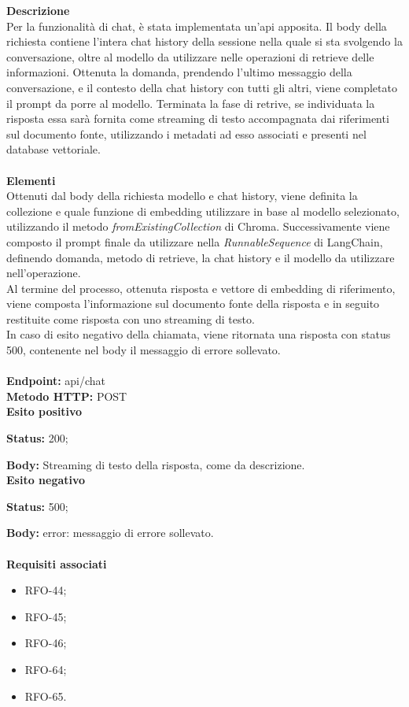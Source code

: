 \textbf{Descrizione}\\
Per la funzionalità di chat, è stata implementata un'api apposita. Il body della richiesta contiene l'intera chat history della sessione nella quale si sta svolgendo la conversazione, oltre al modello da utilizzare nelle operazioni di retrieve delle informazioni. Ottenuta la domanda, prendendo l'ultimo messaggio della conversazione, e il contesto della chat history con tutti gli altri, viene completato il prompt da porre al modello. Terminata la fase di retrive, se individuata la risposta essa sarà fornita come streaming di testo accompagnata dai riferimenti sul documento fonte, utilizzando i metadati ad esso associati e presenti nel database vettoriale. \\ \\
\textbf{Elementi}\\
Ottenuti dal body della richiesta modello e chat history, viene definita la collezione e quale funzione di embedding utilizzare in base al modello selezionato, utilizzando il metodo \textit{fromExistingCollection} di Chroma. Successivamente viene composto il prompt finale da utilizzare nella \textit{RunnableSequence} di LangChain, definendo domanda, metodo di retrieve, la chat history e il modello da utilizzare nell'operazione.\\
Al termine del processo, ottenuta risposta e vettore di embedding di riferimento, viene composta l'informazione sul documento fonte della risposta e in seguito restituite come risposta con uno streaming di testo.\\
In caso di esito negativo della chiamata, viene ritornata una risposta con status 500, contenente nel body il messaggio di errore sollevato.\\ \\
\textbf{Endpoint: }api/chat\\
\textbf{Metodo HTTP: }POST\\
\textbf{Esito positivo}

\textbf{Status: }200;

\textbf{Body: }Streaming di testo della risposta, come da descrizione.\\
\textbf{Esito negativo}

\textbf{Status: }500;

\textbf{Body: }error: messaggio di errore sollevato.\\ \\
\textbf{Requisiti associati}
\begin{itemize}[itemsep=-4pt]
    \item RFO-44;
    \item RFO-45;
    \item RFO-46;
    \item RFO-64;
    \item RFO-65.
\end{itemize}


\newpage

